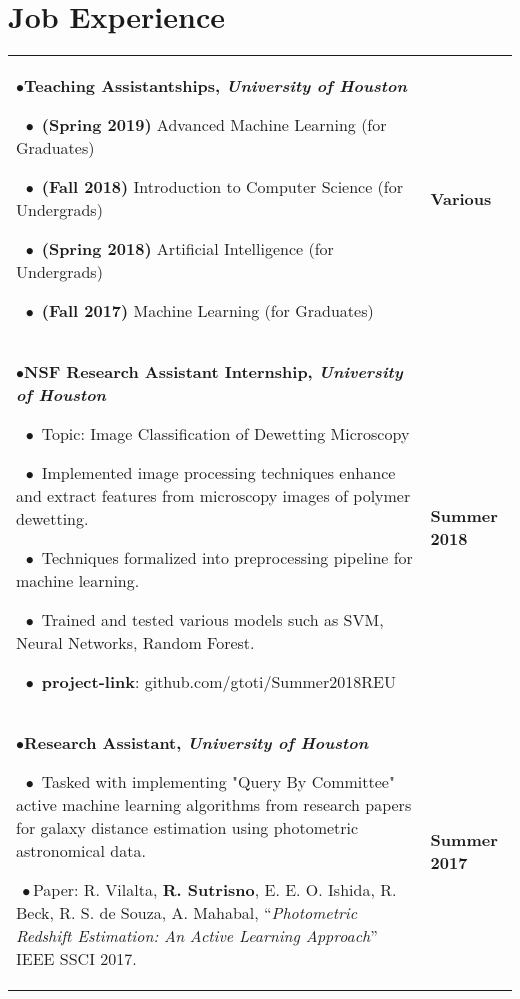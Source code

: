 \documentclass{article}
\begin{document}
\section{Job Experience}
\begin{flushleft}
\begin{tabular}{p{13.5cm} p{2.5cm}}
{$\bullet$}\textbf{Teaching Assistantships, \textit{University of Houston}}

    $\ \ \bullet$ \textbf{(Spring 2019)} Advanced Machine Learning (for Graduates) 

    $\ \ \bullet$ \textbf{(Fall 2018)}  Introduction to Computer Science (for Undergrads) 

    $\ \ \bullet$ \textbf{(Spring 2018)} Artificial Intelligence (for Undergrads) 

    $\ \ \bullet$ \textbf{(Fall 2017)}  Machine Learning (for Graduates) 

    &
    \textbf{Various} \\[0.75cm]


{$\bullet$}\textbf{NSF Research Assistant Internship, \textit{University of Houston}}

    $\ \ \bullet$ Topic: Image Classification of Dewetting Microscopy

    $\ \ \bullet$ Implemented image processing techniques enhance and extract features
    from microscopy images of polymer dewetting. 

    $\ \ \bullet$ Techniques formalized into preprocessing pipeline for machine learning.

    $\ \ \bullet$ Trained and tested various models such as SVM, Neural Networks, Random Forest.

    $\ \ \bullet$ \textbf{project-link}: github.com/gtoti/Summer2018REU

    & \textbf{Summer 2018}
    \\[0.75cm]


{$\bullet$}\textbf{Research Assistant, \textit{University of Houston}}

    $\ \ \bullet$ Tasked with implementing "Query By Committee" active machine learning algorithms from research papers for galaxy distance estimation using photometric astronomical data.

{$\ \bullet$}Paper: R. Vilalta, \textbf{R. Sutrisno}, E. E. O. Ishida, R. Beck, R. S. de Souza, A. Mahabal,
``\textit{Photometric Redshift Estimation: An Active Learning Approach}'' IEEE SSCI 2017.


    & \textbf{Summer 2017}


\end{tabular}
\end{flushleft}
\end{document}
